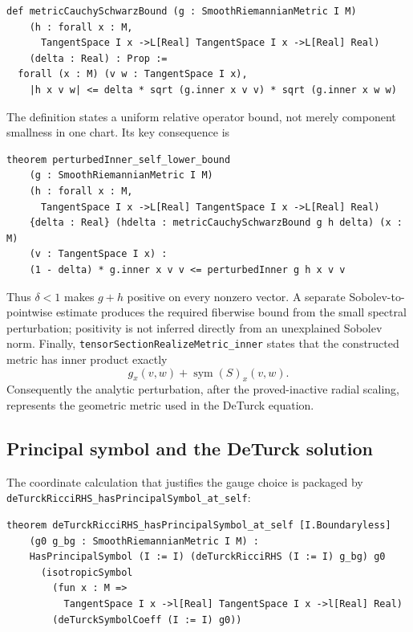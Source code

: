 \documentclass[11pt]{article}
\theoremstyle{plain}
\theoremstyle{definition}
\theoremstyle{remark}
\newcommand{\leanref}[1]{\nolinkurl{#1}}
\begin{document}
\begin{Verbatim}[breaklines=true,breakanywhere=true,fontsize=\small]
def metricCauchySchwarzBound (g : SmoothRiemannianMetric I M)
    (h : forall x : M,
      TangentSpace I x ->L[Real] TangentSpace I x ->L[Real] Real)
    (delta : Real) : Prop :=
  forall (x : M) (v w : TangentSpace I x),
    |h x v w| <= delta * sqrt (g.inner x v v) * sqrt (g.inner x w w)
\end{Verbatim}

The definition states a uniform relative operator bound, not merely component
smallness in one chart.  Its key consequence is

\begin{Verbatim}[breaklines=true,breakanywhere=true,fontsize=\small]
theorem perturbedInner_self_lower_bound
    (g : SmoothRiemannianMetric I M)
    (h : forall x : M,
      TangentSpace I x ->L[Real] TangentSpace I x ->L[Real] Real)
    {delta : Real} (hdelta : metricCauchySchwarzBound g h delta) (x : M)
    (v : TangentSpace I x) :
    (1 - delta) * g.inner x v v <= perturbedInner g h x v v
\end{Verbatim}

Thus $\delta<1$ makes $g+h$ positive on every nonzero vector.  A separate
Sobolev-to-pointwise estimate produces the required fiberwise bound from the
small spectral perturbation; positivity is not inferred directly from an
unexplained Sobolev norm.  Finally,
\leanref{tensorSectionRealizeMetric_inner} states that the constructed metric
has inner product exactly
\[
  g_x(v,w)+\operatorname{sym}(S)_x(v,w).
\]
Consequently the analytic perturbation, after the proved-inactive radial
scaling, represents the geometric metric used in the DeTurck equation.

\subsection{Principal symbol and the DeTurck solution}
\label{subsec:short-time-deturck}

The coordinate calculation that justifies the gauge choice is packaged by
\leanref{deTurckRicciRHS_hasPrincipalSymbol_at_self}:

\begin{Verbatim}[breaklines=true,breakanywhere=true,fontsize=\small]
theorem deTurckRicciRHS_hasPrincipalSymbol_at_self [I.Boundaryless]
    (g0 g_bg : SmoothRiemannianMetric I M) :
    HasPrincipalSymbol (I := I) (deTurckRicciRHS (I := I) g_bg) g0
      (isotropicSymbol
        (fun x : M =>
          TangentSpace I x ->l[Real] TangentSpace I x ->l[Real] Real)
        (deTurckSymbolCoeff (I := I) g0))
\end{Verbatim}
\end{document}
